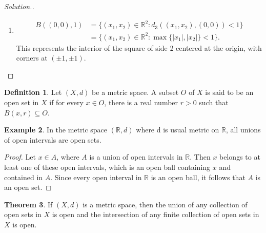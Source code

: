 \documentclass[11pt,a4paper]{article}
\theoremstyle{definition}
\newtheorem{thm}{Theorem}[subsection]
\newtheorem{defn}[thm]{Definition}
\newtheorem{exa}[thm]{Example}
\newenvironment{solution}
  {\renewcommand{\qedsymbol}{}\begin{proof}[\textit{Solution}.]}
  {\end{proof}}
\begin{document}
\begin{solution}
\begin{enumerate}
\item[iii] 
\begin{align*}
B((0,0),1) &=\{(x_1,x_2)\in \mathbb{R}^2:d_3((x_1,x_2),(0,0))<1\}\\
           &=\{(x_1,x_2)\in \mathbb{R}^2:\max\{|x_1|,|x_2|\}<1\}.
\end{align*}
This represents the interior of the square of side 2 centered at the origin, with corners at $(\pm1,\pm1)$.





\begin{figure}[H]
\centering
{}
\end{figure}


\end{enumerate}
\end{solution}


\begin{defn}
Let $(X,d)$ be a metric space. A subset $O$ of $X$ is said to be an open set in $X$ if for every $x\in O$, there is a real number $r>0$ such that $B(x,r)\subseteq O$.
\end{defn}



\begin{exa}
In the metric space $(\mathbb{R},d)$ where d is usual metric on $\mathbb{R}$, all unions of open intervals are open sets.
\end{exa}

\begin{proof}
Let $x\in A$, where $A$ is a union of open intervals in $\mathbb{R}$. Then $x$ belongs to at least one of these open intervals, which is an open ball containing $x$ and contained in $A$. Since every open interval in $\mathbb{R}$ is an open ball, it follows that $A$ is an open set.
\end{proof}

\begin{thm}
If $(X,d)$ is a metric space, then the union of any collection of open sets in $X$ is open and the intersection of any finite collection of open sets in $X$ is open.
\end{thm}
\end{document}
